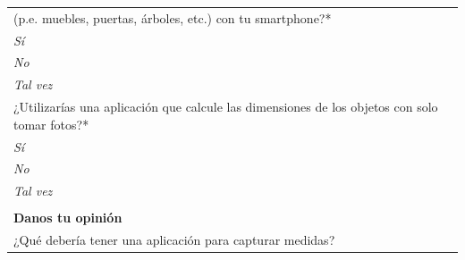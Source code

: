 \begin{center}
\begin{tabular}{|p{16cm}|}
	   (p.e. muebles, puertas, árboles, etc.) con tu smartphone?\textcolor{rojo}{*}\\
	   \hspace{1cm}\textit{Sí}\\
	   \hspace{1cm}\textit{No}\\
	   \hspace{1cm}\textit{Tal vez}\\
	   \hline
	   ¿Utilizarías una aplicación que calcule las dimensiones de los objetos con solo tomar fotos?\textcolor{rojo}{*}\\
	   \hspace{1cm}\textit{Sí}\\
	   \hspace{1cm}\textit{No}\\
	   \hspace{1cm}\textit{Tal vez}\\
	   \hline
	\rowcolor[rgb]{0.8,0.8,0.8}\\
            \rowcolor[rgb]{0.8,0.8,0.8}
            \textbf{\color{darkgray}Danos tu opinión} \\ [0.3cm]
            ¿Qué debería tener una aplicación para capturar medidas?\\
            \hline
    \end{tabular}
    \end{center}
\newpage 

